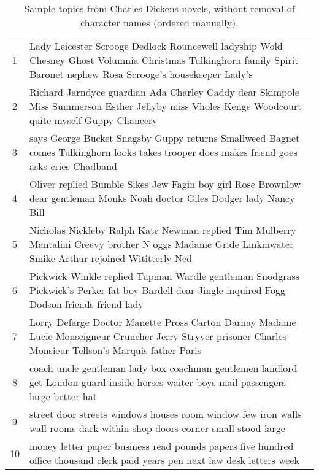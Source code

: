 \begin{table}[htp]
\caption{Sample topics from Charles Dickens novels, without removal of character names (ordered manually).}
\begin{center}
\begin{tabular}{|c|p{15cm}|}
1 & Lady Leicester Scrooge Dedlock Rouncewell ladyship Wold Chesney Ghost Volumnia Christmas Tulkinghorn family Spirit Baronet nephew Rosa Scrooge's housekeeper Lady's \\
2 & Richard Jarndyce guardian Ada Charley Caddy dear Skimpole Miss Summerson Esther Jellyby miss Vholes Kenge Woodcourt quite myself Guppy Chancery \\
3 & says George Bucket Snagsby Guppy returns Smallweed Bagnet comes Tulkinghorn looks takes trooper does makes friend goes asks cries Chadband \\
4 & Oliver replied Bumble Sikes Jew Fagin boy girl Rose Brownlow dear gentleman Monks Noah doctor Giles Dodger lady Nancy Bill \\
5& Nicholas Nickleby Ralph Kate Newman replied Tim Mulberry Mantalini Creevy brother N oggs Madame Gride Linkinwater Smike Arthur rejoined Wititterly Ned \\
6 & Pickwick Winkle replied Tupman Wardle gentleman Snodgrass Pickwick's Perker fat boy Bardell dear Jingle inquired Fogg Dodson friends friend lady  \\
7 &  Lorry Defarge Doctor Manette Pross Carton Darnay Madame Lucie Monseigneur Cruncher Jerry Stryver prisoner Charles Monsieur Tellson's Marquis father Paris \\
8 & coach uncle gentleman lady box coachman gentlemen landlord get London guard inside horses waiter boys mail passengers large better hat \\
9 & street door streets windows houses room window few iron walls wall rooms dark within shop doors corner small stood large  \\
10 & money letter paper business read pounds papers five hundred office thousand clerk paid years pen next law desk letters week \\
\end{tabular}
\end{center}
\label{tbl:dickens-with-names}
\end{table}%


